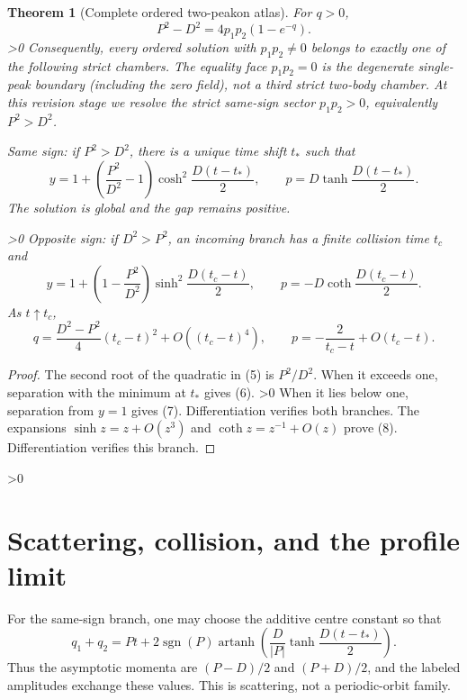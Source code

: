 \documentclass[10pt]{article}
\providecommand{\CRevisionRound}{2}
\newtheorem{theorem}{Theorem}
\newcommand{\sgn}{\operatorname{sgn}}
\begin{document}
\begin{theorem}[Complete ordered two-peakon atlas]\label{thm:main}
For $q>0$,
\[
 P^2-D^2=4p_1p_2(1-e^{-q}).
\]
\ifnum\CRevisionRound>0
Consequently, every ordered solution with $p_1p_2\ne0$ belongs to exactly
one of the following strict chambers.  The equality face $p_1p_2=0$ is the
degenerate single-peak boundary (including the zero field), not a third
strict two-body chamber.
\else
At this revision stage we resolve the strict same-sign sector
$p_1p_2>0$, equivalently $P^2>D^2$.
\fi

\emph{Same sign:} if $P^2>D^2$, there is a unique time shift $t_*$ such that
\begin{equation}
 y=1+\left(\frac{P^2}{D^2}-1\right)
       \cosh^2\!\frac{D(t-t_*)}{2},\qquad
 p=D\tanh\!\frac{D(t-t_*)}{2}.
\end{equation}
The solution is global and the gap remains positive.

\ifnum\CRevisionRound>0
\emph{Opposite sign:} if $D^2>P^2$, an incoming branch has a finite collision
time $t_c$ and
\begin{equation}
 y=1+\left(1-\frac{P^2}{D^2}\right)
       \sinh^2\!\frac{D(t_c-t)}{2},\qquad
 p=-D\coth\!\frac{D(t_c-t)}{2}.
\end{equation}
As $t\uparrow t_c$,
\begin{equation}
 q=\frac{D^2-P^2}{4}(t_c-t)^2+O((t_c-t)^4),\qquad
 p=-\frac{2}{t_c-t}+O(t_c-t).
\end{equation}
\fi
\end{theorem}
\begin{proof}
The second root of the quadratic in (5) is $P^2/D^2$.  When it exceeds one,
separation with the minimum at $t_*$ gives (6).
\ifnum\CRevisionRound>0
When it lies below one, separation from $y=1$ gives (7).  Differentiation
verifies both branches.  The expansions $\sinh z=z+O(z^3)$ and
$\coth z=z^{-1}+O(z)$ prove (8).
\else
Differentiation verifies this branch.
\fi
\end{proof}

\ifnum\CRevisionRound>0
\section{Scattering, collision, and the profile limit}
For the same-sign branch, one may choose the additive centre constant so that
\begin{equation}
 q_1+q_2=Pt+2\sgn(P)\operatorname{artanh}
 \left(\frac{D}{|P|}\tanh\frac{D(t-t_*)}{2}\right).
\end{equation}
Thus the asymptotic momenta are $(P-D)/2$ and $(P+D)/2$, and the labeled
amplitudes exchange these values.  This is scattering, not a periodic-orbit
family.
\end{document}
